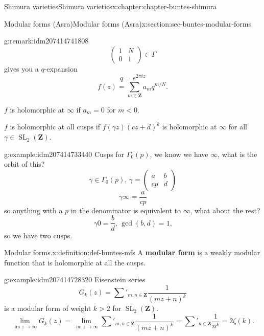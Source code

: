 \documentclass[oneside,10pt,]{book}
\newcommand{\terminology}[1]{\textbf{#1}}
\numberwithin{equation}{section}
\newcommand{\ZZ}{\mathbf{Z}}
\DeclareMathOperator{\im}{im}
\DeclareMathOperator{\SL}{SL}
\newcommand{\lt}{<}
\newcommand{\gt}{>}
\newcommand{\amp}{&}
\begin{document}
\begin{chapterptx}{Shimura varieties}{}{Shimura varieties}{}{}{x:chapter:chapter-buntes-shimura}
\begin{sectionptx}{Modular forms (Asra)}{}{Modular forms (Asra)}{}{}{x:section:sec-buntes-modular-forms}
\begin{remark}{}{g:remark:idm207414741808}
\begin{equation*}
\begin{pmatrix} 1\amp N \\ 0 \amp 1 \end{pmatrix} \in \Gamma
\end{equation*}
gives you a \(q\)-expansion%
\begin{equation*}
q=  e^{2\pi i z}
\end{equation*}
%
\begin{equation*}
f(z) = \sum_{m\in \ZZ} a_m  q^{m/N}\text{.}
\end{equation*}
%
\par
\(f\) is holomorphic at \(\infty\) if \(a_m  = 0\) for \(m \lt 0\).%
\par
\(f\) is holomorphic at all cusps if \(f(\gamma z)(cz+d)^k\) is holomorphic at \(\infty\) for all \(\gamma \in \SL_2(\ZZ)\).%
\end{remark}
\begin{example}{}{g:example:idm207414733440}%
Cusps for \(\Gamma_0(p)\), we know we have \(\infty\), what is the orbit of this?%
\begin{equation*}
\gamma\in \Gamma_0(p),\, \gamma  =  \begin{pmatrix} a\amp b \\ cp \amp d    \end{pmatrix}
\end{equation*}
%
\begin{equation*}
\gamma \infty  = \frac{a}{cp}
\end{equation*}
so anything with  a \(p\) in the denominator is equivalent to \(\infty\), what about the rest?%
\begin{equation*}
\gamma 0  = \frac{b}{d}, \, \gcd(b,d)  =1\text{,}
\end{equation*}
so we have two cusps.%
\end{example}
\begin{definition}{Modular forms.}{x:definition:def-buntes-mfs}%
A \terminology{modular form} is  a weakly modular function that is holomorphic at all the cusps.%
\end{definition}
\begin{example}{}{g:example:idm207414728320}%
Eisenstein series%
\begin{equation*}
G_k(z) = \sum'_{m,n\in \ZZ} \frac{1}{(mz+n)^k}
\end{equation*}
is a modular form of weight \(k \gt 2\) for \(\SL_2(\ZZ)\).%
\begin{equation*}
\lim_{\im z\to \infty} G_k(z) = \lim_{\im z\to \infty} \sum'_{m,n\in \ZZ} \frac{1}{(mz+n)^k} = \sum'_{n\in \ZZ} \frac{1}{n^k} = 2\zeta(k)\text{.}

\end{equation*}
\end{example}
\end{sectionptx}
\end{chapterptx}
\end{document}
